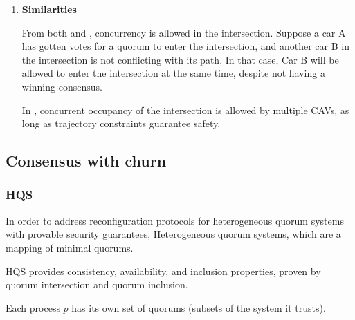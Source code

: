 \documentclass[fleqn,10pt]{olplainarticle}
\begin{document}
\begin{enumerate}
\begin{itemize}
    \item \textbf{Init:} $t=0$, set of vehicles $N^0$, states $S_{ij}^0$.
    \item \textbf{Iterate:} collect neighbors’ predictions, solve local optimization, update by averaging (Powell), repeat until stable.
    \item \textbf{Implement:} apply first step of trajectory, rebroadcast rest.
\end{itemize}

\textbf{Safety:} guaranteed via collision-avoidance constraints (no near-crashes).  

\textbf{Liveness:} not formally proven; empirically converges in 5--10 iterations.



\item 
\textbf{Similarities}

From both \cite{inproceedings} and \cite{lee2025distributedconsensusalgorithmprioritizing}, concurrency is allowed in the intersection. Suppose a car A has gotten votes for a quorum to enter the intersection, and another car B in the intersection is not conflicting with its path. In that case, Car B will be allowed to enter the intersection at the same time, despite not having a winning consensus. 

In \cite{MIRHELI2019161}, concurrent occupancy of the intersection is allowed by multiple CAVs, as long as trajectory constraints guarantee safety.


\end{enumerate}

\subsection{Consensus with churn}

\subsubsection{HQS}

In order to address reconfiguration protocols for heterogeneous quorum systems with provable security guarantees, \cite{HQS}
Heterogeneous quorum systems, which are a mapping of minimal quorums. 

HQS provides consistency, availability, and inclusion properties, proven by quorum intersection and quorum inclusion.

Each process $p$ has its own set of quorums (subsets of the system it trusts).
\end{document}
